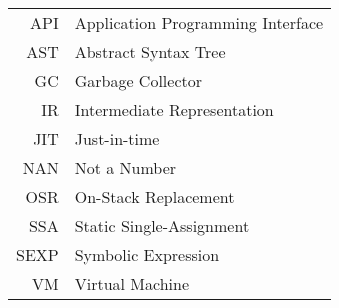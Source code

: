 \documentclass[english,master,oneside]{ctufit-thesis}
\begin{document}
\begin{tabular}{rl}
	API  & Application Programming Interface \\
	AST  & Abstract Syntax Tree              \\
	GC   & Garbage Collector                 \\
	IR   & Intermediate Representation       \\
	JIT  & Just-in-time                      \\
	NAN  & Not a Number                      \\
	OSR  & On-Stack Replacement              \\
	SSA  & Static Single-Assignment          \\
	SEXP & Symbolic Expression               \\
	VM   & Virtual Machine                   \\
\end{tabular}


\resumeTOCentries
\mainmatter\mainmatterinit %








\appendix\appendixinit %



\backmatter %

\printbibliography %
\end{document}
